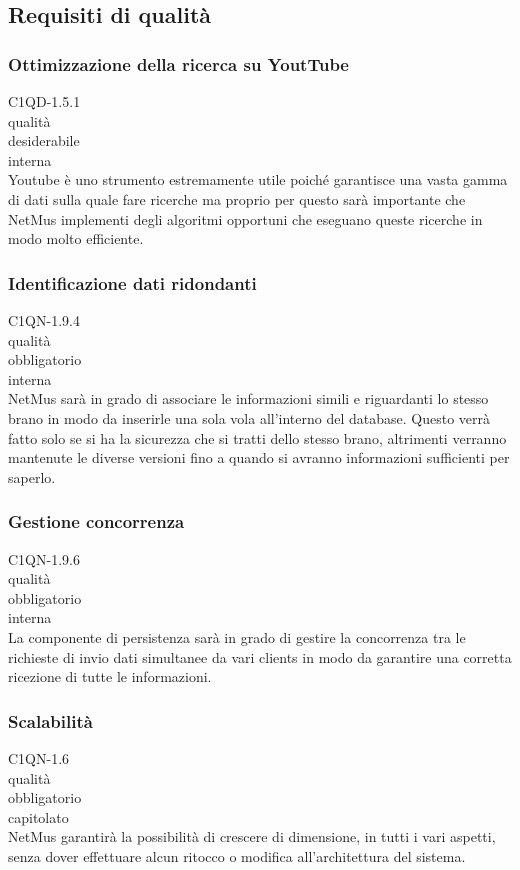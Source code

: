 \subsection{Requisiti di qualit\`a}

\subsubsection*{Ottimizzazione della ricerca su YoutTube}
 C1QD-1.5.1 \\
 qualit\`a \\
 desiderabile \\
 interna \\
Youtube \`e uno strumento estremamente utile poich\'e garantisce una vasta gamma di
dati sulla quale fare ricerche ma proprio per questo sar\`a importante che NetMus
implementi degli algoritmi opportuni che eseguano queste ricerche in modo molto
efficiente.

\subsubsection*{Identificazione dati ridondanti}
 C1QN-1.9.4 \\
 qualit\`a \\
 obbligatorio \\
 interna \\
NetMus sar\`a in grado di associare le informazioni simili e
riguardanti lo stesso brano in modo da inserirle una sola vola all'interno del
database. Questo verr\`a fatto solo se si ha la sicurezza che si tratti dello
stesso brano, altrimenti verranno mantenute le diverse versioni fino a quando si
avranno informazioni sufficienti per saperlo.

\subsubsection*{Gestione concorrenza}
 C1QN-1.9.6 \\
 qualit\`a \\
 obbligatorio \\
 interna \\
La componente di persistenza sar\`a in grado di gestire la concorrenza tra le
richieste di invio dati simultanee da vari clients in modo da garantire una
corretta ricezione di tutte le informazioni.

\subsubsection*{Scalabilit\`a}
 C1QN-1.6 \\
 qualit\`a \\
 obbligatorio \\
 capitolato \\
NetMus garantir\`a la possibilit\`a di crescere di dimensione, in tutti i vari
aspetti, senza dover effettuare alcun ritocco o modifica all'architettura del
sistema.

